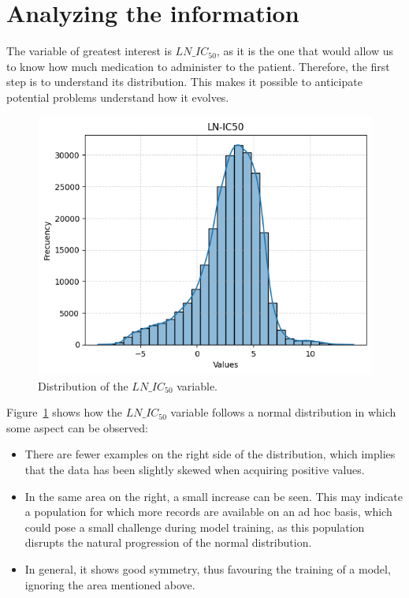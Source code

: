 \section{Analyzing the information}

The variable of greatest interest is \(LN\_IC_{50}\), as it is the one that would allow us to know how much medication to administer to the patient. Therefore, the first step is to understand its distribution. This makes it possible to anticipate potential problems understand how it evolves.

\begin{figure}[H]
    \centering
    \includegraphics[width=1\textwidth]{figures/LNIC_50_barplot.png}
    \caption{Distribution of the \(LN\_IC_{50}\) variable.}
    \label{fig:lnic50_distribution}
\end{figure}

Figure~\ref{fig:lnic50_distribution} shows how the \(LN\_IC_{50}\) variable follows a normal distribution in which some aspect can be observed:

\begin{itemize}
    \item There are fewer examples on the right side of the distribution, which implies that the data has been slightly skewed when acquiring positive values.
    \item In the same area on the right, a small increase can be seen. This may indicate a population for which more records are available on an ad hoc basis, which could pose a small challenge during model training, as this population disrupts the natural progression of the normal distribution.
    \item In general, it shows good symmetry, thus favouring the training of a model, ignoring the area mentioned above.
\end{itemize}


